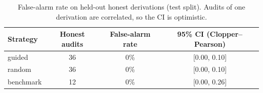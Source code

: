 \begin{table}[t]
\centering
\caption{False-alarm rate on held-out honest derivations (test split). Audits of one derivation are correlated, so the CI is optimistic.}
\label{tab:fpr}
\footnotesize
\begin{tabular}{lccc}
\toprule
Strategy & Honest audits & False-alarm rate & 95\% CI (Clopper--Pearson) \\
\midrule
guided & 36 & 0\% & [0.00, 0.10] \\
random & 36 & 0\% & [0.00, 0.10] \\
benchmark & 12 & 0\% & [0.00, 0.26] \\
\bottomrule
\end{tabular}
\end{table}